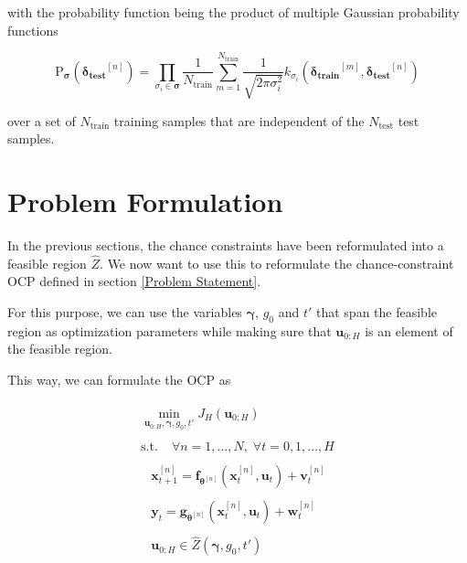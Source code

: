 with the probability function being the product of multiple Gaussian probability functions 

 \begin{equation} \label{Gaussian Probability}
\text{P}_{\boldsymbol{\sigma}} ( \boldsymbol{\delta_\text{test}}^{[n]} ) = \prod_{\sigma_i \in \boldsymbol{\sigma}} \frac{1}{N_\text{train}} \sum_{m = 1}^{N_\text{train}} \frac{1}{\sqrt{2 \pi \sigma_i^2}} k_{\sigma_i}(\boldsymbol{\delta_\text{train}}^{[m]} ,\boldsymbol{\delta_\text{test}}^{[n]})
\end{equation}

over a set of $N_\text{train}$ training samples that are independent of the $N_\text{test}$ test samples.


\section{Problem Formulation} \label{Problem Formulation}

In the previous sections, the chance constraints have been reformulated into a feasible region $\hat{Z}$. We now want to use this to reformulate the chance-constraint OCP defined in section \ref{Problem Statement}. 

For this purpose, we can use the variables $\boldsymbol{\gamma}$, $g_0$ and $t'$ that span the feasible region as optimization parameters while making sure that $\boldsymbol{u}_{0:H}$ is an element of the feasible region.

This way, we can formulate the OCP as

\begin{subequations}
\begin{align}
\begin{split}
\min\limits_{\boldsymbol{u}_{0:H},\boldsymbol{\gamma}, g_0, t' }  J_H(\boldsymbol{u}_{0:H})
\end{split}\\
\begin{split}
\text{s.t.}\; &\forall n = 1,...,N, \;  \forall t = 0,1,...,H
\end{split}\\
\begin{split}\label{systemc1}
&\boldsymbol{x}_{t+1}^{[n]} = \boldsymbol{f}_{\boldsymbol{\theta}^{[n]}} \left( \boldsymbol{x}_{t}^{[n]} , \boldsymbol{u}_t \right) + \boldsymbol{v}_{t}^{[n]}
\end{split}\\
\begin{split}\label{systemc2}
&\boldsymbol{y}_{t} = \boldsymbol{g}_{\boldsymbol{\theta}^{[n]}} \left( \boldsymbol{x}_{t}^{[n]}, \boldsymbol{u}_t \right) + \boldsymbol{w}_{t}^{[n]}
\end{split}\\
\begin{split}\label{systemc3}
 &\boldsymbol{u}_{0:H} \in \hat{Z}(\boldsymbol{\gamma}, g_0, t')
\end{split}
\end{align}
\label{OCP_final}
\end{subequations}

